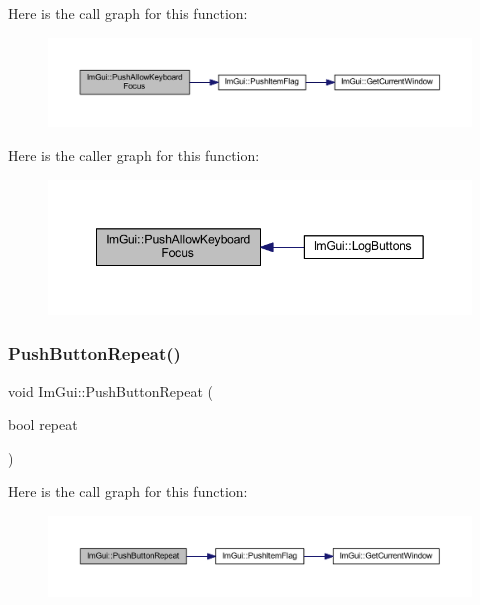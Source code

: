 Here is the call graph for this function\+:
\nopagebreak
\begin{figure}[H]
\begin{center}
\leavevmode
\includegraphics[width=350pt]{namespace_im_gui_adf7c3cfdcbb06617bb70ff1526d064f4_cgraph}
\end{center}
\end{figure}
Here is the caller graph for this function\+:
\nopagebreak
\begin{figure}[H]
\begin{center}
\leavevmode
\includegraphics[width=349pt]{namespace_im_gui_adf7c3cfdcbb06617bb70ff1526d064f4_icgraph}
\end{center}
\end{figure}
\mbox{\label{namespace_im_gui_a61d3e0191d67bedaf45f0178f87e3125}} 
\subsubsection{\texorpdfstring{Push\+Button\+Repeat()}{PushButtonRepeat()}}
{\footnotesize\ttfamily void Im\+Gui\+::\+Push\+Button\+Repeat (\begin{DoxyParamCaption}\item[{bool}]{repeat }\end{DoxyParamCaption})}

Here is the call graph for this function\+:
\nopagebreak
\begin{figure}[H]
\begin{center}
\leavevmode
\includegraphics[width=350pt]{namespace_im_gui_a61d3e0191d67bedaf45f0178f87e3125_cgraph}
\end{center}
\end{figure}
\mbox{\label{namespace_im_gui_a11c8bd8676e1281e15b24c9615b6904a}} 
